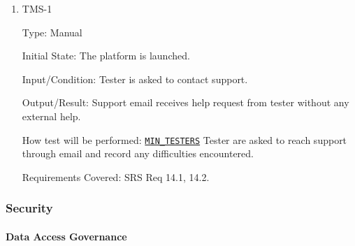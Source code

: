 \documentclass[12pt, titlepage]{article}
\begin{document}
\begin{enumerate}

    \item{TMS-1\\}

          Type: Manual

          Initial State: The platform is launched.

          Input/Condition: Tester is asked to contact support.

          Output/Result: Support email receives help request from tester without any external help.

          How test will be performed: \hyperref[MIN_TESTERS]{\texttt{MIN\_TESTERS}} Tester are asked to reach
          support through email and record any difficulties encountered.

          Requirements Covered: SRS Req 14.1, 14.2.

\end{enumerate}

\subsubsection{Security}

\paragraph{Data Access Governance}
\end{document}
